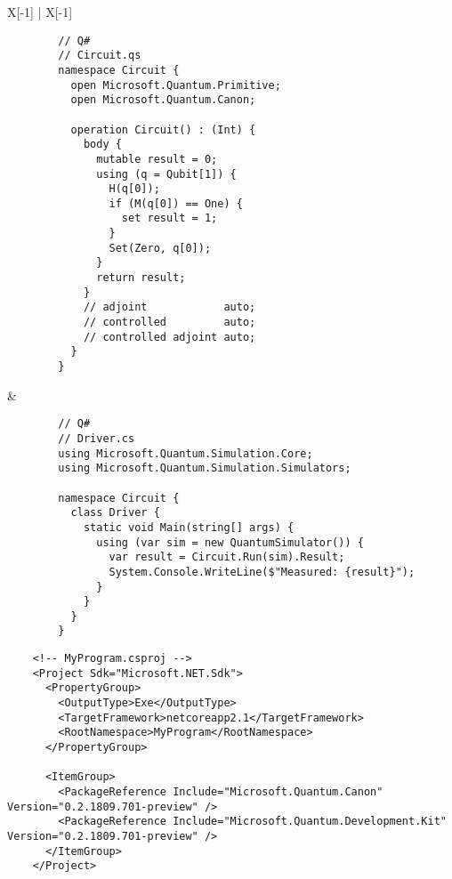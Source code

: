 \documentclass[a4paper, landscape]{article}
\begin{document}
\vspace{0.5cm}
\begin{tabu*}{ X[-1] | X[-1] }
	\begin{verbatim}
		// Q#
		// Circuit.qs
		namespace Circuit {
		  open Microsoft.Quantum.Primitive;
		  open Microsoft.Quantum.Canon;

		  operation Circuit() : (Int) {
		    body {
		      mutable result = 0;
		      using (q = Qubit[1]) {
		        H(q[0]);
		        if (M(q[0]) == One) {
		          set result = 1;
		        }
		        Set(Zero, q[0]);
		      }
		      return result;
		    }
		    // adjoint            auto;
		    // controlled         auto;
		    // controlled adjoint auto;
		  }
		}
	\end{verbatim}
	&
	\begin{verbatim}
		// Q#
		// Driver.cs
		using Microsoft.Quantum.Simulation.Core;
		using Microsoft.Quantum.Simulation.Simulators;

		namespace Circuit {
		  class Driver {
		    static void Main(string[] args) {
		      using (var sim = new QuantumSimulator()) {
		        var result = Circuit.Run(sim).Result;
		        System.Console.WriteLine($"Measured: {result}");
		      }
		    }
		  }
		}
	\end{verbatim}
\end{tabu*}

\begin{verbatim}
	<!-- MyProgram.csproj -->
	<Project Sdk="Microsoft.NET.Sdk">
	  <PropertyGroup>
	    <OutputType>Exe</OutputType>
	    <TargetFramework>netcoreapp2.1</TargetFramework>
	    <RootNamespace>MyProgram</RootNamespace>
	  </PropertyGroup>

	  <ItemGroup>
	    <PackageReference Include="Microsoft.Quantum.Canon"           Version="0.2.1809.701-preview" />
	    <PackageReference Include="Microsoft.Quantum.Development.Kit" Version="0.2.1809.701-preview" />
	  </ItemGroup>
	</Project>
\end{verbatim}

\newpage
\end{document}
